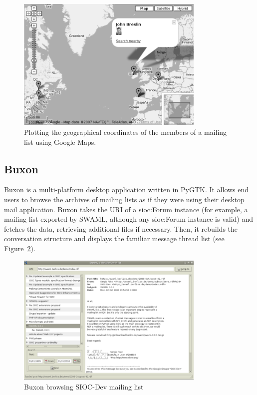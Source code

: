 \documentclass{llncs}
\begin{document}
\begin{figure}[ht]
 \centering
 \includegraphics[width=9cm]{images/googlemaps.png}
 \caption{\label{fig:googlemaps}Plotting the geographical coordinates of
the members of a mailing list using Google Maps.}
\end{figure}

\subsection{Buxon}

Buxon is a multi-platform desktop application written in PyGTK.
It allows end users to browse the archives of mailing lists as if
they were using their desktop mail application. Buxon takes
the URI of a \textsf{sioc:Forum} instance (for example, a mailing list
exported by SWAML, although any \textsf{sioc:Forum} instance
is valid) and fetches the data, retrieving additional files
if necessary. Then, it rebuilds the conversation structure and
displays the familiar message thread list (see Figure~\ref{fig:buxon}).

\begin{figure}[ht]
 \centering
 \includegraphics[width=9cm]{images/buxon.png}
 \caption{\label{fig:buxon}Buxon browsing SIOC-Dev mailing list}
\end{figure}
\end{document}
